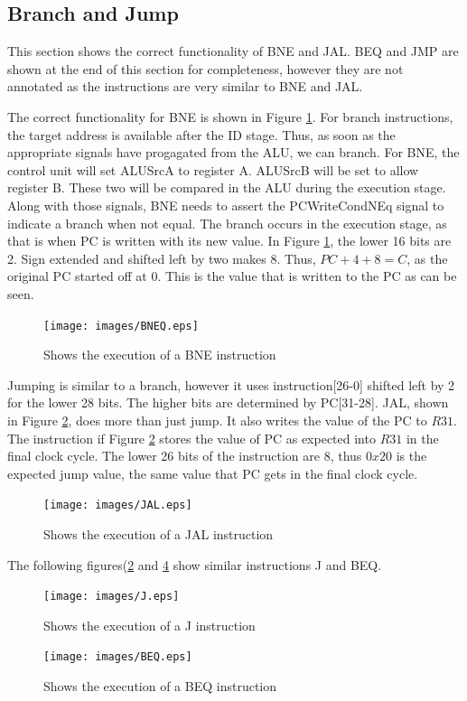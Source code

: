 \documentclass[12pt, a4paper]{article}
\begin{document}
\subsection{Branch and Jump}
This section shows the correct functionality of BNE and JAL. BEQ and JMP are shown at the end of this
section for completeness, however they are not annotated as the instructions are very similar to BNE
and JAL.

The correct functionality for BNE is shown in Figure \ref{fig:bne}. For branch instructions, the
target address is available after the ID stage. Thus, as soon as the appropriate signals have progagated
from the ALU, we can branch. For BNE, the control unit will set ALUSrcA to register A. ALUSrcB will
be set to allow register B. These two will be compared in the ALU during the execution stage. Along
with those signals, BNE needs to assert the PCWriteCondNEq signal to indicate a branch when not equal.
The branch occurs in the execution stage, as that is when PC is written with its new value. In Figure
\ref{fig:bne}, the lower 16 bits are 2. Sign extended and shifted left by two makes 8. Thus, $PC + 4 + 8 = C$,
as the original PC started off at 0. This is the value that is written to the PC as can be seen.
\begin{figure}[h!]
  \centering
  \texttt{[image: images/BNEQ.eps]}
  \caption{Shows the execution of a BNE instruction}
  \label{fig:bne}
\end{figure}

Jumping is similar to a branch, however it uses instruction[26-0] shifted left by 2 for the lower 28 bits.
The higher bits are determined by PC[31-28]. JAL, shown in Figure \ref{fig:jal}, does more than just jump.
It also writes the value of the PC to $R31$. The instruction if Figure \ref{fig:jal} stores the value of
PC as expected into $R31$ in the final clock cycle. The lower 26 bits of the instruction are 8, thus $0x20$
is the expected jump value, the same value that PC gets in the final clock cycle.

\begin{figure}[h!]
  \centering
  \texttt{[image: images/JAL.eps]}
  \caption{Shows the execution of a JAL instruction}
  \label{fig:jal}
\end{figure}

The following figures(\ref{fig:jal} and \ref{fig:beq} show similar instructions J and BEQ.
\begin{figure}[h!]
  \centering
  \texttt{[image: images/J.eps]}
  \caption{Shows the execution of a J instruction}
  \label{fig:j}
\end{figure}
\begin{figure}[h!]
  \centering
  \texttt{[image: images/BEQ.eps]}
  \caption{Shows the execution of a BEQ instruction}
  \label{fig:beq}
\end{figure}
\end{document}

